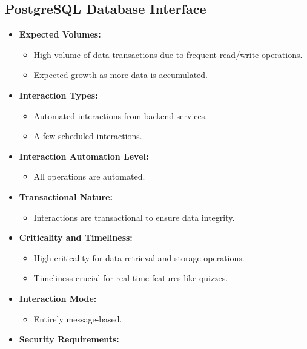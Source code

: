 \subsection*{PostgreSQL Database Interface}
\begin{itemize}
    \item \textbf{Expected Volumes:}
          \begin{itemize}
              \item High volume of data transactions due to frequent read/write operations.
              \item Expected growth as more data is accumulated.
          \end{itemize}
    \item \textbf{Interaction Types:}
          \begin{itemize}
              \item Automated interactions from backend services.
              \item A few scheduled interactions.
          \end{itemize}
    \item \textbf{Interaction Automation Level:}
          \begin{itemize}
              \item All operations are automated.
          \end{itemize}
    \item \textbf{Transactional Nature:}
          \begin{itemize}
              \item Interactions are transactional to ensure data integrity.
          \end{itemize}
    \item \textbf{Criticality and Timeliness:}
          \begin{itemize}
              \item High criticality for data retrieval and storage operations.
              \item Timeliness crucial for real-time features like quizzes.
          \end{itemize}
    \item \textbf{Interaction Mode:}
          \begin{itemize}
              \item Entirely message-based.
          \end{itemize}
    \item \textbf{Security Requirements:}
          \begin{itemize}

\end{itemize}
\end{itemize}
